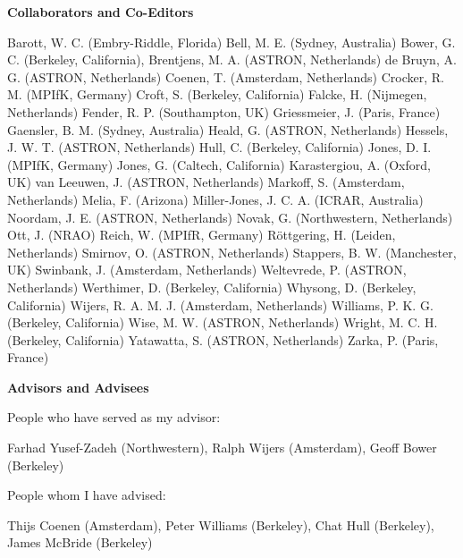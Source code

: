 \documentclass[11pt]{article}
\begin{document}
{\bf Collaborators and Co-Editors}

Barott, W. C. (Embry-Riddle, Florida)
Bell, M. E. (Sydney, Australia)
Bower, G. C. (Berkeley, California), 
Brentjens, M. A. (ASTRON, Netherlands)
de Bruyn, A. G. (ASTRON, Netherlands)
Coenen, T. (Amsterdam, Netherlands)
Crocker, R. M. (MPIfK, Germany)
Croft, S. (Berkeley, California)
Falcke, H. (Nijmegen, Netherlands)
Fender, R. P. (Southampton, UK)
Griessmeier, J. (Paris, France)
Gaensler, B. M. (Sydney, Australia)
Heald, G. (ASTRON, Netherlands)
Hessels, J. W. T. (ASTRON, Netherlands)
Hull, C. (Berkeley, California)
Jones, D. I. (MPIfK, Germany)
Jones, G. (Caltech, California)
Karastergiou, A. (Oxford, UK)
van Leeuwen, J. (ASTRON, Netherlands)
Markoff, S. (Amsterdam, Netherlands)
Melia, F. (Arizona)
Miller-Jones, J. C. A. (ICRAR, Australia)
Noordam, J. E. (ASTRON, Netherlands)
Novak, G. (Northwestern, Netherlands)
Ott, J. (NRAO)
Reich, W. (MPIfR, Germany)
R\"ottgering, H. (Leiden, Netherlands)
Smirnov, O. (ASTRON, Netherlands)
Stappers, B. W. (Manchester, UK)
Swinbank, J. (Amsterdam, Netherlands)
Weltevrede, P. (ASTRON, Netherlands)
Werthimer, D. (Berkeley, California)
Whysong, D. (Berkeley, California)
Wijers, R. A. M. J. (Amsterdam, Netherlands)
Williams, P. K. G. (Berkeley, California)
Wise, M. W. (ASTRON, Netherlands)
Wright, M. C. H. (Berkeley, California)
Yatawatta, S. (ASTRON, Netherlands)
Zarka, P. (Paris, France)

{\bf Advisors and Advisees}

People who have served as my advisor:

Farhad Yusef-Zadeh (Northwestern), Ralph Wijers (Amsterdam), Geoff Bower (Berkeley)

People whom I have advised:

Thijs Coenen (Amsterdam), Peter Williams (Berkeley), Chat Hull (Berkeley), James McBride (Berkeley)

\thispagestyle{empty}
\end{document}
